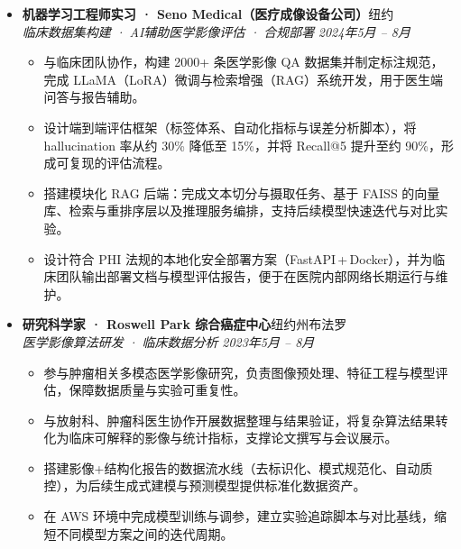 \documentclass[letterpaper,10pt]{article}
\begin{document}
\begin{itemize}[leftmargin=0in, label={}]

  \item
  \textbf{机器学习工程师实习 · Seno Medical（医疗成像设备公司）}\hfill 纽约 \\
  \textit{临床数据集构建 · AI辅助医学影像评估 · 合规部署} \hfill \textit{2024年5月 -- 8月}
  \begin{itemize}[leftmargin=0.2in, topsep=1pt]
    \item 与临床团队协作，构建 2000+ 条医学影像 QA 数据集并制定标注规范，完成 LLaMA（LoRA）微调与检索增强（RAG）系统开发，用于医生端问答与报告辅助。
    \item 设计端到端评估框架（标签体系、自动化指标与误差分析脚本），将 hallucination 率从约 30\% 降低至 15\%，并将 Recall@5 提升至约 90\%，形成可复现的评估流程。
    \item 搭建模块化 RAG 后端：完成文本切分与摄取任务、基于 FAISS 的向量库、检索与重排序层以及推理服务编排，支持后续模型快速迭代与对比实验。
    \item 设计符合 PHI 法规的本地化安全部署方案（FastAPI\,+\,Docker），并为临床团队输出部署文档与模型评估报告，便于在医院内部网络长期运行与维护。
  \end{itemize}

  \vspace{3pt}

  \item
  \textbf{研究科学家 · Roswell Park 综合癌症中心}\hfill 纽约州布法罗 \\
  \textit{医学影像算法研发 · 临床数据分析} \hfill \textit{2023年5月 -- 8月}
  \begin{itemize}[leftmargin=0.2in, topsep=1pt]
    \item 参与肿瘤相关多模态医学影像研究，负责图像预处理、特征工程与模型评估，保障数据质量与实验可重复性。
    \item 与放射科、肿瘤科医生协作开展数据整理与结果验证，将复杂算法结果转化为临床可解释的影像与统计指标，支撑论文撰写与会议展示。
    \item 搭建影像+结构化报告的数据流水线（去标识化、模式规范化、自动质控），为后续生成式建模与预测模型提供标准化数据资产。
    \item 在 AWS 环境中完成模型训练与调参，建立实验追踪脚本与对比基线，缩短不同模型方案之间的迭代周期。
  \end{itemize}

  \vspace{3pt}


\end{itemize}
\end{document}
